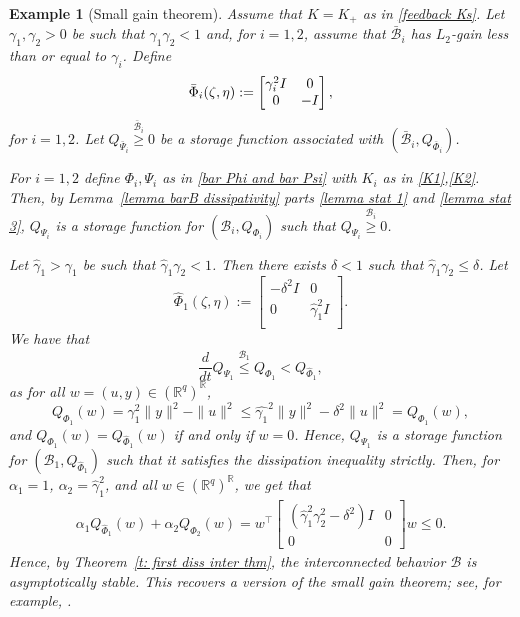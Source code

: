 \documentclass[letterpaper, 10 pt, conference]{ieeeconf}
\theoremstyle{ieeeconf}
\newtheorem{example}{Example}
\newcommand{\R}{\mathbb{R}}
\newcommand{\B}{\mathcal{B}}
\begin{document}
\begin{example}[Small gain theorem]
	Assume that $K=K_+$ as in \eqref{feedback Ks}.
	Let $\gamma_1,\gamma_2>0$ be such that $\gamma_1 \gamma_2 <1$ and, for $i=1,2$, assume that $\bar{\B}_i$ has $L_2$-gain less than or equal to $\gamma_i$. Define \vspace{-0.5ex}
	\[\bar{\Phi}_i(\zeta,\eta):=\begin{bmatrix}
		\gamma_i^2 I & 0 \\ 0 & -I
	\end{bmatrix},
	\vspace{-1ex}\]
	for $i=1,2$.
	Let $Q_{\bar{\Psi}_i}\stackrel{\bar{\B}_i}{\geq}0$ be a storage function associated with $(\bar{\B}_i,Q_{\bar{\Phi}_i})$. 
	
	For $i=1,2$ define $\Phi_i,\Psi_i$ as in \eqref{bar Phi and bar Psi} with $K_i$ as in \eqref{K1},\eqref{K2}.
	Then, by Lemma~\ref{lemma barB dissipativity} parts \ref{lemma stat 1} and \ref{lemma stat 3}, $Q_{\Psi_i}$ is a storage function for $(\B_i, Q_{\Phi_i})$ such that ${Q_{\Psi_i} \stackrel{\B_i}{\geq}0}$. 
	
	Let $\hat{\gamma}_1>\gamma_1$ be such that $\hat{\gamma}_1\gamma_2<1$. Then there exists $\delta<1$ such that $\hat{\gamma}_1\gamma_2\leq \delta$. Let \[\hat{\Phi}_1(\zeta,\eta):=\begin{bmatrix}
		-\delta^2 I & 0 \\0 & \hat{\gamma}_1^2 I\\
	\end{bmatrix}.\]
	We have that
	\[\frac{d}{dt}Q_{\Psi_1} \stackrel{\B_1}{\leq}
	Q_{\Phi_1}< Q_{\hat{\Phi}_1},\]
	as for all $w=(u,y)\in \left(\R^q\right)^\R $,
	\[Q_{\Phi_1}(w)=\gamma_1^2 \|y\|^2 - \|u\|^2\leq \hat{\gamma_1}^2\|y\|^2-\delta^2 \|u\|^2 = Q_{\Phi_1}(w),\]
	and $Q_{\Phi_1}(w) = Q_{\hat{\Phi}_1}(w)$ if and only if $w=0$.
	Hence, $Q_{\Psi_1}$ is a storage function for $(\B_1,Q_{\hat{\Phi}_1})$ such that it satisfies the dissipation inequality strictly. Then, for ${\alpha_1 =1}$, ${\alpha_2 = \hat{\gamma}_1^2}$, and all $w\in \left(\R^q\right)^\R$, we get that
	\begin{gather*}
		\alpha_1 Q_{\hat{\Phi}_1}(w)+\alpha_2Q_{\Phi_2}(w) = 
		w^\top \begin{bmatrix}
			\left( \hat{\gamma}_1^2\gamma_2^2-\delta^2\right) I & 0 \\ 0 & 0
		\end{bmatrix}w \leq 0.
	\end{gather*} 
	Hence, by Theorem~\ref{t: first diss inter thm}, the interconnected behavior $\B$ is asymptotically stable. This recovers a version of the small gain theorem; see, for example, \cite{zhou_essentials_1998}.
\end{example}
\end{document}
